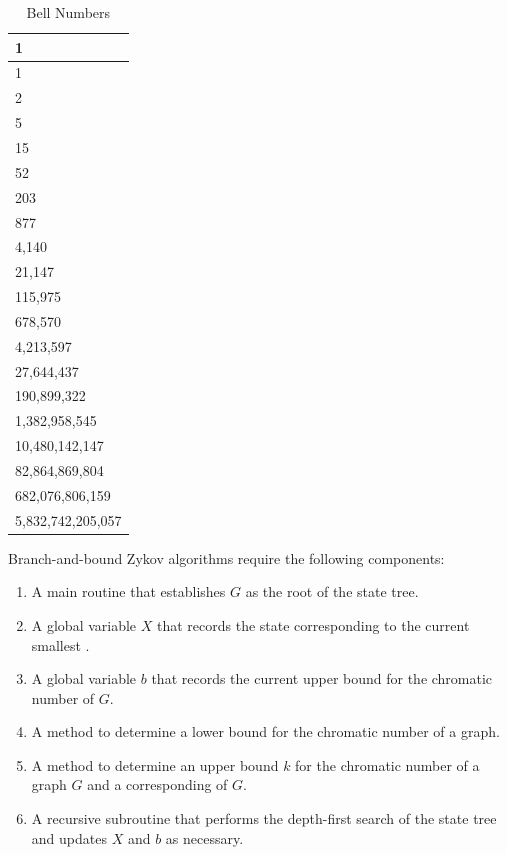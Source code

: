 \begin{table}[H]
  \centering
  \caption{Bell Numbers}
  \label{tab:bell}
  \begin{tabular}{|l|}
    \hline
    1 \\
    \hline
    1 \\
    \hline
    2 \\
    \hline
    5 \\
    \hline
    15 \\
    \hline
    52 \\
    \hline
    203 \\
    \hline
    877 \\
    \hline
    4,140 \\
    \hline
    21,147 \\
    \hline
    115,975 \\
    \hline
    678,570 \\
    \hline
    4,213,597 \\
    \hline
    27,644,437 \\
    \hline
    190,899,322 \\
    \hline
    1,382,958,545 \\
    \hline
    10,480,142,147 \\
    \hline
    82,864,869,804 \\
    \hline
    682,076,806,159 \\
    \hline
    5,832,742,205,057 \\
    \hline
  \end{tabular}
\end{table}

Branch-and-bound Zykov algorithms require the following components:
\begin{enumerate}
\item A main routine that establishes \(G\) as the root of the state tree.
\item A global variable \(X\) that records the state corresponding to the current smallest .
\item A global variable \(b\) that records the current upper bound for the chromatic number of \(G\).
\item A method to determine a lower bound for the chromatic number of a graph.
\item A method to determine an upper bound \(k\) for the chromatic number of a graph \(G\) and a corresponding
   of \(G\).
\item A recursive subroutine that performs the depth-first search of the state tree and updates \(X\) and \(b\) as
  necessary.
\end{enumerate}

